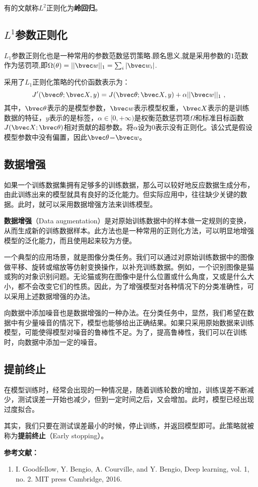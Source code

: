 有的文献称$L^2$正则化为\textbf{岭回归}。


\subsection{$L^1$参数正则化}

$L_1$参数正则化也是一种常用的参数范数惩罚策略.顾名思义,就是采用参数的$1$范数作为惩罚项,即$\Omega(\theta)=||\bvec w||_1=\sum_i|\bvec w_i|$.

采用了$L_1$正则化策略的代价函数表示为：
\begin{equation}
J'(\bvec \theta;\bvec X,y)=J(\bvec \theta;\bvec X,y)+\alpha||\bvec w||_1~,
\end{equation}
其中，$\bvec \theta$表示的是模型参数，$\bvec w$表示模型权重，$\bvec X$表示的是训练数据的特征，$y$表示的是标签，$\alpha\in[0,+\infty)$是权衡范数惩罚项$\Omega$和标准目标函数$J(\bvec X; \bvec \theta)$相对贡献的超参数。将$\alpha$设为$0$表示没有正则化。该公式是假设模型参数中没有偏置，因此$\bvec \theta$=$\bvec w$。


\subsection{数据增强}

如果一个训练数据集拥有足够多的训练数据，那么可以较好地反应数据生成分布，由此训练出来的模型就具有良好的泛化能力。但实际应用中，往往缺少关键的数据。此时，就可以采用数据增强方法来训练模型。

\textbf{数据增强}（Data augmentation）是对原始训练数据中的样本做一定规则的变换，从而生成新的训练数据样本。此方法也是一种常用的正则化方法，可以明显地增强模型的泛化能力，而且使用起来较为方便。

一个典型的应用场景，就是图像分类任务。我们可以通过对原始训练数据中的图像做平移、旋转或缩放等仿射变换操作，以补充训练数据。例如，一个识别图像是猫或狗的对象识别问题。无论猫或狗在图像中是什么位置或什么角度，又或是什么大小，都不会改变它们的性质。因此，为了增强模型对各种情况下的分类准确性，可以采用上述数据增强的办法。

向数据中添加噪音也是数据增强的一种办法。在分类任务中，显然，我们希望在数据中有少量噪音的情况下，模型也能够给出正确结果。如果只采用原始数据来训练模型，可能使得模型对噪音的鲁棒性不足。为了，提高鲁棒性，我们可以在训练时，向数据中添加一定的噪音。


\subsection{提前终止}

在模型训练时，经常会出现的一种情况是，随着训练轮数的增加，训练误差不断减少，测试误差一开始也减少，但到一定时间之后，又会增加。此时，模型已经出现过度拟合。

其实，我们只要在测试误差最小的时候，停止训练，并返回模型即可。此策略就被称为\textbf{提前终止}（Early stopping）。


\textbf{参考文献：}
\begin{enumerate}
\item I. Goodfellow, Y. Bengio, A. Courville, and Y. Bengio, Deep learning, vol. 1, no. 2. MIT press Cambridge, 2016.
\end{enumerate}
